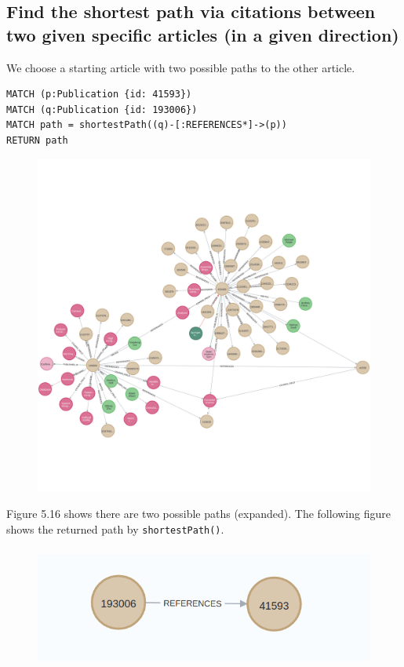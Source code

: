 \documentclass{Configuration_Files/PoliMi3i_thesis}
\begin{document}
\subsection{Find the shortest path via citations between two given specific articles (in a given direction)}
We choose a starting article with two possible paths to the other article.
\begin{lstlisting}[language=cypher, label=lst:cypher-example]
MATCH (p:Publication {id: 41593})
MATCH (q:Publication {id: 193006})
MATCH path = shortestPath((q)-[:REFERENCES*]->(p))
RETURN path
\end{lstlisting}
\begin{figure}[H]
    \centering
    \includegraphics[height=0.5\textwidth]{Images/query_11.png}
        \caption{}
    \label{fig:quadtree}
\end{figure}
Figure 5.16 shows there are two possible paths (expanded). The following figure shows the returned path by \texttt{shortestPath()}.\\
\begin{figure}[H]
    \centering
    \includegraphics[width=120mm, height=40mm]{Images/query_11_2.png}
        \caption{}
    \label{fig:quadtree}
\end{figure}
\newpage
\end{document}
